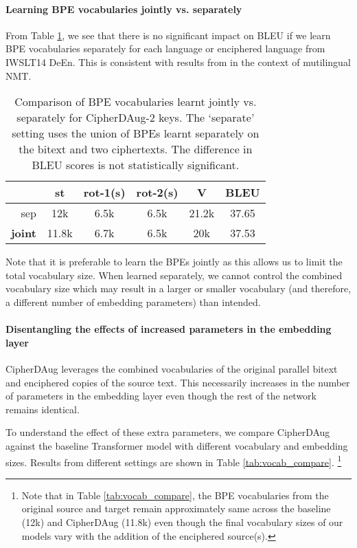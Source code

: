 \documentclass[11pt]{article}
\begin{document}
\paragraph{Learning BPE vocabularies jointly vs. separately}
From Table \ref{tab:my_label}, we see that 
there is no significant impact on BLEU
if we 
learn BPE vocabularies separately for each language or enciphered language from IWSLT14 DeEn.
This is consistent with results from \citet{neubig-hu-2018-rapid} in the context of mutilingual NMT.
\begin{table}[!ht]
\small
    \centering
    \begin{tabular}{rccccc}
    \toprule
         & st & rot-1(s) & rot-2(s) & V & BLEU \\ \midrule
    sep &  12k & 6.5k & 6.5k & 21.2k & 37.65 \\
    \textbf{joint} &  11.8k & 6.7k & 6.5k & 20k & 37.53 \\
    \bottomrule
    \end{tabular}
    \caption{Comparison of BPE vocabularies learnt jointly vs. separately for CipherDAug-2 keys. The `separate' setting uses the union of BPEs learnt separately on the bitext and two ciphertexts. The difference in BLEU scores is not statistically significant.}
    \label{tab:my_label}
\end{table}

Note that it is preferable to learn the BPEs jointly as this allows us to limit the total vocabulary size. When learned separately, we cannot control the combined vocabulary size which may result in a larger or smaller vocabulary (and therefore, a different number of embedding parameters) than intended.

\paragraph{Disentangling the effects of increased parameters in the embedding layer}\label{sec:emb_sizes}

CipherDAug leverages the combined vocabularies of the original parallel bitext and enciphered copies of the source text. This necessarily increases in the number of parameters in the embedding layer even though the rest of the network remains identical. 

To understand the effect of these extra parameters, we compare CipherDAug against the baseline Transformer model with different vocabulary and embedding sizes. Results from different settings are shown in Table \ref{tab:vocab_compare}. \footnote{Note that in Table \ref{tab:vocab_compare}, the BPE vocabularies from the original source and target remain approximately same across the baseline (12k) and CipherDAug (11.8k) even though the final vocabulary sizes of our models vary with the addition of the enciphered source(s).}
\end{document}

